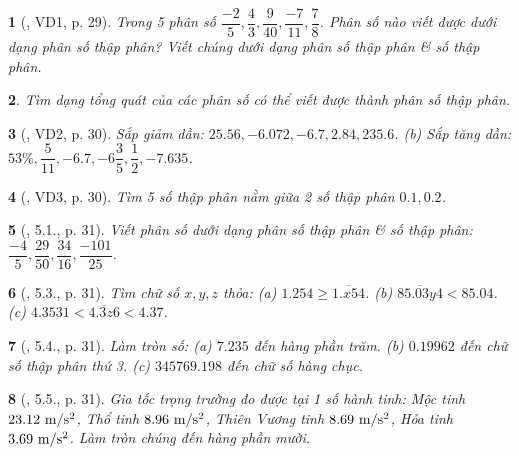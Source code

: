 \documentclass{article}
\newtheorem{baitoan}{}
\begin{document}
\begin{baitoan}[\cite{Binh_boi_duong_Toan_6_tap_2}, VD1, p. 29]
	Trong 5 phân số $\dfrac{-2}{5},\dfrac{4}{3},\dfrac{9}{40},\dfrac{-7}{11},\dfrac{7}{8}$. Phân số nào viết được dưới dạng phân số thập phân? Viết chúng dưới dạng phân số thập phân \& số thập phân.
\end{baitoan}

\begin{baitoan}
	Tìm dạng tổng quát của các phân số có thể viết được thành phân số thập phân.
\end{baitoan}

\begin{baitoan}[\cite{Binh_boi_duong_Toan_6_tap_2}, VD2, p. 30]
	Sắp giảm dần: $25.56,-6.072,-6.7,2.84,235.6$. (b) Sắp tăng dần: $53\%,\dfrac{5}{11},-6.7,-6\dfrac{3}{5},\dfrac{1}{2},-7.635$.
\end{baitoan}

\begin{baitoan}[\cite{Binh_boi_duong_Toan_6_tap_2}, VD3, p. 30]
	Tìm 5 số thập phân nằm giữa 2 số thập phân $0.1,0.2$.
\end{baitoan}

\begin{baitoan}[\cite{Binh_boi_duong_Toan_6_tap_2}, 5.1., p. 31]
	Viết phân số dưới dạng phân số thập phân \& số thập phân: $\dfrac{-4}{5},\dfrac{29}{50},\dfrac{34}{16},\dfrac{-101}{25}$.
\end{baitoan}

\begin{baitoan}[\cite{Binh_boi_duong_Toan_6_tap_2}, 5.3., p. 31]
	Tìm chữ số $x,y,z$ thỏa: (a) $1.254\ge\overline{1.x54}$. (b) $\overline{85.03y4} < 85.04$. (c) $4.3531 < \overline{4.3z6} < 4.37$.
\end{baitoan}

\begin{baitoan}[\cite{Binh_boi_duong_Toan_6_tap_2}, 5.4., p. 31]
	Làm tròn số: (a) $7.235$ đến hàng phần trăm. (b) $0.19962$ đến chữ số thập phân thứ 3. (c) $345769.198$ đến chữ số hàng chục.
\end{baitoan}

\begin{baitoan}[\cite{Binh_boi_duong_Toan_6_tap_2}, 5.5., p. 31]
	Gia tốc trọng trường đo được tại 1 số hành tinh: Mộc tinh $\rm23.12\ m{\tt/}s^2$, Thổ tinh $\rm8.96\ m{\tt/}s^2$, Thiên Vương tinh $\rm8.69\ m{\tt/}s^2$, Hỏa tinh $\rm3.69\ m{\tt/}s^2$. Làm tròn chúng đến hàng phần mười.
\end{baitoan}
\end{document}
